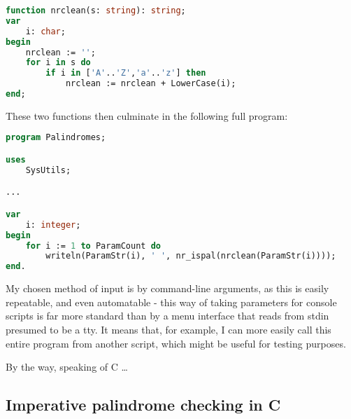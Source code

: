 \documentclass{article}
\begin{document}
\begin{lstlisting}[language=Pascal, caption=Nonrecursive `clean' function in Pascal]
function nrclean(s: string): string;
var
    i: char;
begin
    nrclean := '';
    for i in s do
        if i in ['A'..'Z','a'..'z'] then
            nrclean := nrclean + LowerCase(i);
end;
\end{lstlisting}

    These two functions then culminate in the following full program:

\begin{lstlisting}[language=Pascal, caption=Remainder of nonrecursive Pascal program]
program Palindromes;

uses
    SysUtils;

...

var
    i: integer;
begin
    for i := 1 to ParamCount do
        writeln(ParamStr(i), ' ', nr_ispal(nrclean(ParamStr(i))));
end.
\end{lstlisting}

    My chosen method of input is by command-line arguments, as this is easily
    repeatable, and even automatable - this way of taking parameters for
    console scripts is far more standard than by a menu interface that reads
    from stdin presumed to be a tty. It means that, for example, I can more
    easily call this entire program from another script, which might be useful
    for testing purposes.

    By the way, speaking of C \ldots

    \subsection{Imperative palindrome checking in C}
\end{document}
